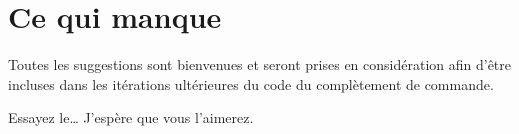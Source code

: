 \documentclass[11pt,french]{article}
\newcommand{\esckey}{\textsf{Esc}}
\newcommand{\shiftkey}{\textsf{Shift}}
\newcommand{\CCT}{\textsf{CommandCompletion.txt}}
\begin{document}

\section*{Ce qui manque}

Toutes les suggestions sont bienvenues et seront prises en considération afin d'être incluses dans les itérations 
ultérieures du code du complètement de commande. 

\vspace{5pt plus 2pt minus 1pt}\noindent
Essayez le… J'espère que vous l'aimerez.

%

\end{document}
